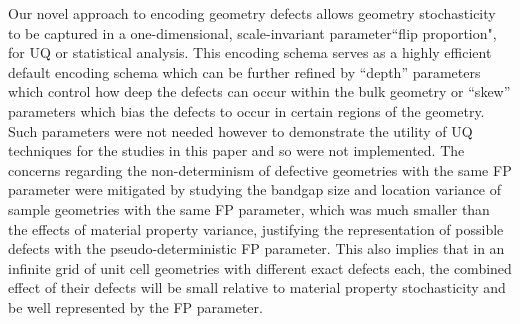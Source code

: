 \documentclass[preprint,review,12pt]{elsarticle}
\begin{document}
Our novel approach to encoding geometry defects allows geometry stochasticity to be captured in a one-dimensional, scale-invariant parameter``flip proportion", for UQ or statistical analysis. This encoding schema serves as a highly efficient default encoding schema which can be further refined by ``depth'' parameters which control how deep the defects can occur within the bulk geometry or ``skew'' parameters which bias the defects to occur in certain regions of the geometry. Such parameters were not needed however to demonstrate the utility of UQ techniques for the studies in this paper and so were not implemented. The concerns regarding the non-determinism of defective geometries with the same FP parameter were mitigated by studying the bandgap size and location variance of sample geometries with the same FP parameter, which was much smaller than the effects of material property variance, justifying the representation of possible defects with the pseudo-deterministic FP parameter. This also implies that in an infinite grid of unit cell geometries with different exact defects each, the combined effect of their defects will be small relative to material property stochasticity and be well represented by the FP parameter.

\end{document}

